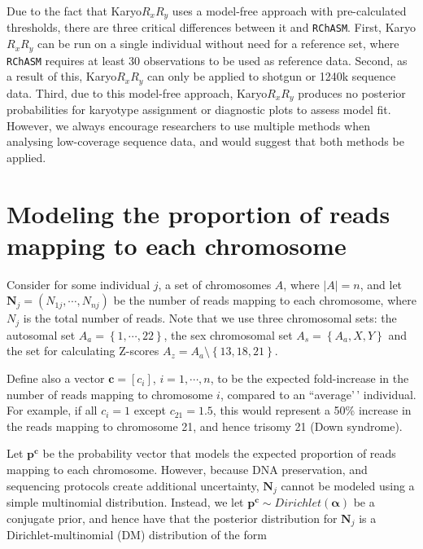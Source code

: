 \documentclass[
  letterpaper,
  DIV=11,
  numbers=noendperiod]{scrartcl}
\begin{document}
Due to the fact that Karyo\(R_{x}R_{y}\) uses a model-free approach with
pre-calculated thresholds, there are three critical differences between
it and \texttt{RChASM}. First, Karyo\(R_{x}R_{y}\) can be run on a
single individual without need for a reference set, where
\texttt{RChASM} requires at least 30 observations to be used as
reference data. Second, as a result of this, Karyo\(R_{x}R_{y}\) can
only be applied to shotgun or 1240k sequence data. Third, due to this
model-free approach, Karyo\(R_{x}R_{y}\) produces no posterior
probabilities for karyotype assignment or diagnostic plots to assess
model fit. However, we always encourage researchers to use multiple
methods when analysing low-coverage sequence data, and would suggest
that both methods be applied.

\section{Modeling the proportion of reads mapping to each
chromosome}\label{modeling-the-proportion-of-reads-mapping-to-each-chromosome}

Consider for some individual \(j\), a set of chromosomes \(A\), where
\(|A|=n\), and let \(\mathbf{N}_j=\left(N_{1j},\cdots,N_{nj}\right)\) be
the number of reads mapping to each chromosome, where \(N_j\) is the
total number of reads. Note that we use three chromosomal sets: the
autosomal set \(A_a = \left\{1,\cdots,22 \right\}\), the sex chromosomal
set \(A_s = \left\{A_a,X,Y \right\}\) and the set for calculating
Z-scores \(A_z = A_a\setminus \left\{13,18,21\right\}\).

Define also a vector \(\mathbf{c} = \left[c_i\right]\),
\(i=1,\cdots,n\), to be the expected fold-increase in the number of
reads mapping to chromosome \(i\), compared to an ``average'\,'
individual. For example, if all \(c_i=1\) except \(c_{21}=1.5\), this
would represent a 50\% increase in the reads mapping to chromosome 21,
and hence trisomy 21 (Down syndrome).

Let \(\mathbf{p}^{\mathbf{c}}\) be the probability vector that models
the expected proportion of reads mapping to each chromosome. However,
because DNA preservation, and sequencing protocols create additional
uncertainty, \(\mathbf{N}_j\) cannot be modeled using a simple
multinomial distribution. Instead, we let
\(\mathbf{p}^{\mathbf{c}} \sim Dirichlet\left(\boldsymbol{\alpha}\right)\)
be a conjugate prior, and hence have that the posterior distribution for
\(\boldsymbol{N}_j\) is a Dirichlet-multinomial (DM) distribution of the
form
\end{document}
